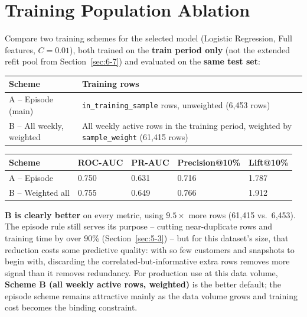 \section{Training Population Ablation}
\label{sec:6-10}

Compare two training schemes for the selected model (Logistic Regression, Full features, $C=0.01$), both trained on the \textbf{train period only} (not the extended refit pool from Section~\ref{sec:6-7}) and evaluated on the \textbf{same test set}:

\begin{center}
\begin{tabular}{@{}p{4.5cm}p{9.6cm}@{}}
    \toprule
    Scheme & Training rows \\
    \midrule
    A -- Episode (main) & \texttt{in\_training\_sample} rows, unweighted (6,453 rows) \\
    B -- All weekly, weighted & All weekly active rows in the training period, weighted by \texttt{sample\_weight} (61,415 rows) \\
    \bottomrule
\end{tabular}
\end{center}

\begin{center}
\begin{tabular}{@{}p{3.2cm}p{1.8cm}p{1.8cm}p{2.4cm}p{1.8cm}@{}}
    \toprule
    Scheme & ROC-AUC & PR-AUC & Precision@10\% & Lift@10\% \\
    \midrule
    A -- Episode & 0.750 & 0.631 & 0.716 & 1.787 \\
    B -- Weighted all & 0.755 & 0.649 & 0.766 & 1.912 \\
    \bottomrule
\end{tabular}
\end{center}

\textbf{B is clearly better} on every metric, using $9.5\times$ more rows (61,415 vs.\ 6,453). The episode rule still serves its purpose -- cutting near-duplicate rows and training time by over 90\% (Section~\ref{sec:5-3}) -- but for this dataset's size, that reduction costs some predictive quality: with so few customers and snapshots to begin with, discarding the correlated-but-informative extra rows removes more signal than it removes redundancy. For production use at this data volume, \textbf{Scheme B (all weekly active rows, weighted)} is the better default; the episode scheme remains attractive mainly as the data volume grows and training cost becomes the binding constraint.
